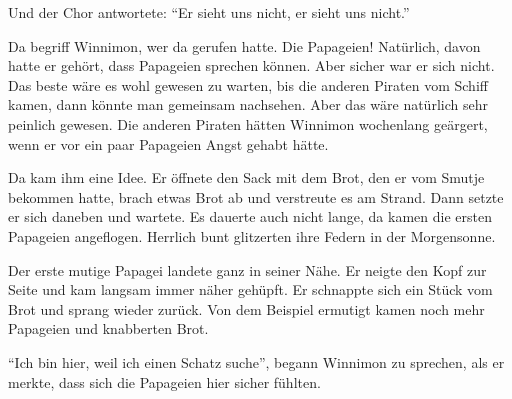 Und der Chor antwortete: \enquote{Er sieht uns nicht, er sieht uns nicht.}



Da begriff Winnimon, wer da gerufen hatte. Die Papageien! Natürlich, davon hatte er gehört, dass Papageien sprechen können. Aber sicher war er sich nicht. Das beste wäre es wohl gewesen zu warten, bis die anderen Piraten vom Schiff kamen, dann könnte man gemeinsam nachsehen. Aber das wäre natürlich sehr peinlich gewesen. Die anderen Piraten hätten Winnimon wochenlang geärgert, wenn er vor ein paar Papageien Angst gehabt hätte. 

Da kam ihm eine Idee. Er öffnete den Sack mit dem Brot, den er vom Smutje bekommen hatte, brach etwas Brot ab und verstreute es am Strand. Dann setzte er sich daneben und wartete. Es dauerte auch nicht lange, da kamen die ersten Papageien angeflogen. Herrlich bunt glitzerten ihre Federn in der Morgensonne.

Der erste mutige Papagei landete ganz in seiner Nähe. Er neigte den Kopf zur Seite und kam langsam immer näher gehüpft. Er schnappte sich ein Stück vom Brot und sprang wieder zurück. Von dem Beispiel ermutigt kamen noch mehr Papageien und knabberten Brot. 

\enquote{Ich bin hier, weil ich einen Schatz suche}, begann Winnimon zu sprechen, als er merkte, dass sich die Papageien hier sicher fühlten.

